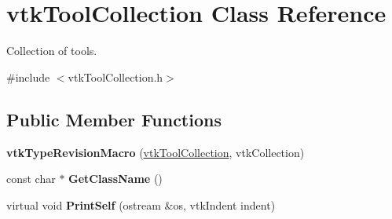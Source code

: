 \hypertarget{classvtkToolCollection}{
\section{vtkToolCollection Class Reference}
\label{classvtkToolCollection}
}


Collection of tools.  




{\ttfamily \#include $<$vtkToolCollection.h$>$}

\subsection*{Public Member Functions}
\begin{DoxyCompactItemize}
\item 
\hypertarget{classvtkToolCollection_a86b0f1336ec168b8e8da4c8b103a8b4f}{
{\bfseries vtkTypeRevisionMacro} (\hyperlink{classvtkToolCollection}{vtkToolCollection}, vtkCollection)}
\label{classvtkToolCollection_a86b0f1336ec168b8e8da4c8b103a8b4f}

\item 
\hypertarget{classvtkToolCollection_a37e5cbc34a1fc7d2d7052e3f98a1a0d7}{
const char $\ast$ {\bfseries GetClassName} ()}
\label{classvtkToolCollection_a37e5cbc34a1fc7d2d7052e3f98a1a0d7}

\item 
\hypertarget{classvtkToolCollection_ade9221fb1eb1d55b01b051954ffd2d54}{
virtual void {\bfseries PrintSelf} (ostream \&os, vtkIndent indent)}
\label{classvtkToolCollection_ade9221fb1eb1d55b01b051954ffd2d54}


\end{DoxyCompactItemize}
